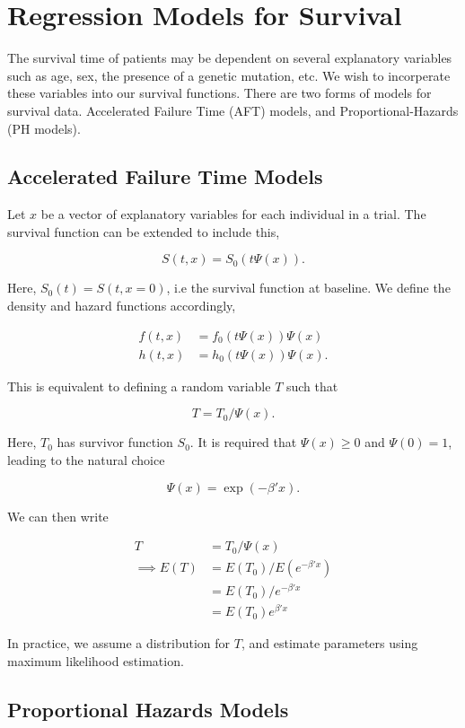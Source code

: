 \section{Regression Models for Survival}

The survival time of patients may be dependent on several explanatory variables such as age, sex, the presence of a genetic mutation, etc. We wish to incorperate these variables into our survival functions. There are two forms of models for survival data. Accelerated Failure Time (AFT) models, and Proportional-Hazards (PH models).

\subsection{Accelerated Failure Time Models}

Let $x$ be a vector of explanatory variables for each individual in a trial. The survival function can be extended to include this,

\[
    S(t, x) = S_0(t\Psi(x)).
\]

Here, $S_0(t) = S(t, x = 0)$, i.e the survival function at baseline. We define the density and hazard functions accordingly,

\begin{align*}
    f(t, x) &= f_0(t\Psi(x))\Psi(x) \\
    h(t, x) &= h_0(t\Psi(x))\Psi(x).
\end{align*}

This is equivalent to defining a random variable $T$ such that

\[
    T = T_0/\Psi(x).  
\]

Here, $T_0$ has survivor function $S_0$. It is required that $\Psi(x) \geq 0$ and $\Psi(0) = 1$, leading to the natural choice 

\[
    \Psi(x) = \exp(-\beta'x).  
\]

We can then write 

\begin{align*}
    T &= T_0/\Psi(x) \\
    \implies E(T) &= E(T_0)/E(e^{-\beta'x}) \\
    &= E(T_0)/e^{-\beta'x} \\
    &= E(T_0)e^{\beta'x}
\end{align*}

In practice, we assume a distribution for $T$, and estimate parameters using maximum likelihood estimation. 

\subsection{Proportional Hazards Models}

